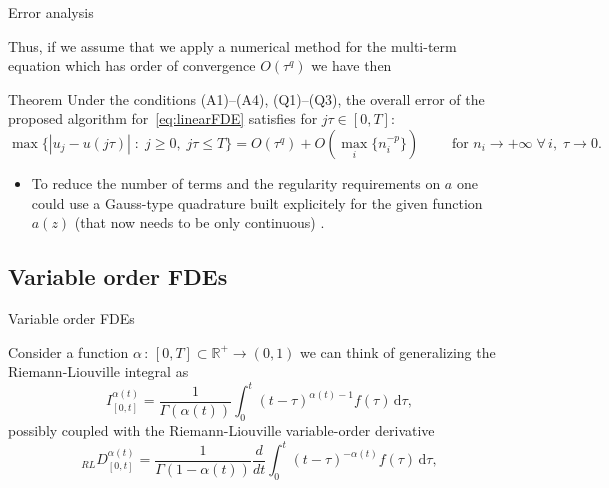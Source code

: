 \documentclass[aspectratio=169,xcolor=dvipsnames]{beamer}
\begin{document}
\begin{frame}{Error analysis}

Thus, if we assume that we apply a numerical method for the multi-term equation which has order of convergence $O(\tau^q)$ we have then
\begin{alertblock}{Theorem \parencite[Theorem~4.1]{DIETHELM200996}}
Under the conditions (A1)--(A4), (Q1)--(Q3), the overall error of the proposed algorithm for~\eqref{eq:linearFDE} satisfies for $j\tau \in [0,T]$:
\[
\max\{ |u_j - u(j\tau) |\;:\; j \geq 0, \; j\tau \leq T \} = O(\tau^q) + O( \max_{i} \{ n_i^{-p} \} ) \qquad \text{ for } n_i \rightarrow +\infty \; \forall\,i, \; \tau \rightarrow 0.
\]
\end{alertblock}

\begin{itemize}
\item[\faWrench] To reduce the number of terms and the regularity requirements on $a$ one could use a Gauss-type quadrature built explicitely for the given function $a(z)$ (that now needs to be only continuous) \parencite{MR4015149}.
\end{itemize}

\end{frame}

\subsection{Variable order FDEs}

\begin{frame}{Variable order FDEs}

Consider a function $\alpha\,:\,[0,T] \subset \mathbb{R}^+ \rightarrow (0,1)$ we can think of generalizing the Riemann-Liouville integral as
\[
I_{[0,t]}^{\alpha(t)} = \frac{1}{\Gamma(\alpha(t))} \int_{0}^{t} (t-\tau)^{\alpha(t)-1} f(\tau)\,\mathrm{d}\tau,
\]
possibly coupled with the Riemann-Liouville variable-order derivative
\[
{}_{RL}D_{[0,t]}^{\alpha(t)} = \frac{1}{\Gamma(1-\alpha(t))} \frac{d}{dt} \int_{0}^{t} (t-\tau)^{-\alpha(t)} f(\tau)\,\mathrm{d}\tau,
\]

\end{frame}
\end{document}
